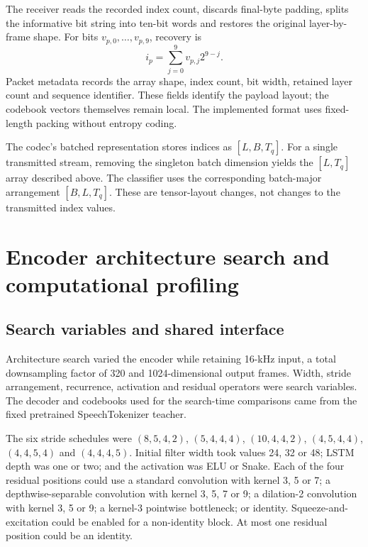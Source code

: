 The receiver reads the recorded index count, discards final-byte padding, splits the informative bit string into ten-bit words and restores the original layer-by-frame shape. For bits $v_{p,0},\ldots,v_{p,9}$, recovery is
\begin{equation}
 i_p=\sum_{j=0}^{9}v_{p,j}2^{9-j}.
 \label{eq:sv2-unpack}
\end{equation}
Packet metadata records the array shape, index count, bit width, retained layer count and sequence identifier. These fields identify the payload layout; the codebook vectors themselves remain local. The implemented format uses fixed-length packing without entropy coding.

The codec's batched representation stores indices as $[L,B,T_q]$. For a single transmitted stream, removing the singleton batch dimension yields the $[L,T_q]$ array described above. The classifier uses the corresponding batch-major arrangement $[B,L,T_q]$. These are tensor-layout changes, not changes to the transmitted index values.

\section{Encoder architecture search and computational profiling}
\label{sec:sv2-nas}

\subsection{Search variables and shared interface}
Architecture search varied the encoder while retaining 16-kHz input, a total downsampling factor of 320 and 1024-dimensional output frames. Width, stride arrangement, recurrence, activation and residual operators were search variables. The decoder and codebooks used for the search-time comparisons came from the fixed pretrained SpeechTokenizer teacher.

The six stride schedules were $(8,5,4,2)$, $(5,4,4,4)$, $(10,4,4,2)$, $(4,5,4,4)$, $(4,4,5,4)$ and $(4,4,4,5)$. Initial filter width took values 24, 32 or 48; LSTM depth was one or two; and the activation was ELU or Snake. Each of the four residual positions could use a standard convolution with kernel 3, 5 or 7; a depthwise-separable convolution with kernel 3, 5, 7 or 9; a dilation-2 convolution with kernel 3, 5 or 9; a kernel-3 pointwise bottleneck; or identity. Squeeze-and-excitation could be enabled for a non-identity block. At most one residual position could be an identity.

